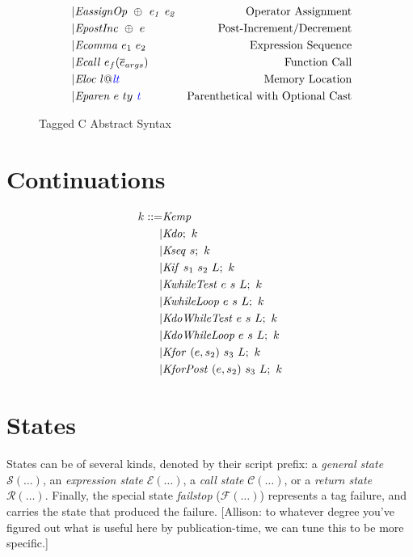 \documentclass{llncs}
\begin{document}
{\begin{figure}
\begin{subfigure}[t]{0.69\textwidth}
\[\begin{aligned}
    | & \mathit{EassignOp ~ \oplus ~ e_1 ~ e_2} & \textnormal{Operator Assignment} \\
    | & \mathit{EpostInc} ~ \oplus ~ e & \textnormal{Post-Increment/Decrement} \\
    | & \mathit{Ecomma} ~ e_1 ~ e_2 & \textnormal{Expression Sequence} \\
    | & \mathit{Ecall} ~ e_f(\overline{e}_{args}) & \textnormal{Function Call} \\
    | & \mathit{Eloc} ~ l@\mathit{\color{blue} lt} & \textnormal{Memory Location} \\
    | & \mathit{Eparen} ~ e ~ ty ~ \mathit{\color{blue} t} & \textnormal{Parenthetical with Optional Cast} \\
    \end{aligned}\]
  \end{subfigure}
  \caption{Tagged C Abstract Syntax}
  \label{fig:syntax}
\end{figure}

\section{Continuations}
\label{app:continuations}

\[\begin{split}
k ::= & \mathit{Kemp} \\
| & \mathit{Kdo};~ k \\
| & \mathit{Kseq} ~ s; ~ k \\
| & \mathit{Kif} ~ s_1 ~ s_2 ~ L; ~ k \\
| & \mathit{KwhileTest} ~ e ~ s ~ L; ~ k \\
| & \mathit{KwhileLoop} ~ e ~ s ~ L; ~ k \\
| & \mathit{KdoWhileTest} ~ e ~ s ~ L; ~ k \\
| & \mathit{KdoWhileLoop} ~ e ~ s ~ L; ~ k \\
| & \mathit{Kfor} ~ (e,s_2) ~ s_3 ~ L ; ~ k \\
| & \mathit{KforPost} ~ (e,s_2) ~ s_3 ~ L ; ~ k \\
\end{split}\]

\section{States}

States can be of several kinds, denoted by their script prefix: a {\em general state} \(\mathcal{S}(\dots)\),
an {\em expression state} \(\mathcal{E}(\dots)\), a {\em call state} \(\mathcal{C}(\dots)\), or a
{\em return state} \(\mathcal{R}(\dots)\). Finally, the special state {\em failstop} (\(\mathcal{F}(\dots)\))
represents a tag failure, and carries the state that produced the failure.
[Allison: to whatever degree you've figured out what is useful here by publication-time, we can
  tune this to be more specific.]

}
\end{document}
